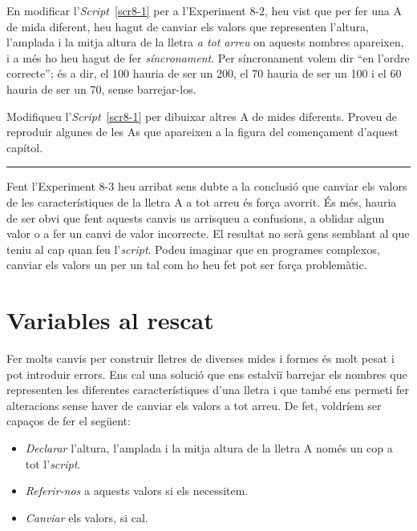 En modificar l'\emph{Script}~\ref{scr8-1} per a l'Experiment 8-2, heu vist que per fer una A de mida diferent, heu hagut de canviar els valors que representen l'altura, l'amplada i la mitja altura de la lletra \emph{a tot arreu} on aquests nombres apareixen, i a més ho heu hagut de fer \emph{síncronament}. Per síncronament volem dir ``en l'ordre correcte''; és a dir, el 100 hauria de ser un 200, el 70 hauria de ser un 100 i el 60 hauria de ser un 70, sense barrejar-los.
\begin{center}
\colorbox{black}{}
\end{center}
{\small
\noindent
Modifiqueu l'\emph{Script}~\ref{scr8-1} per dibuixar altres A de mides diferents. Proveu de reproduir algunes de les As que apareixen a la figura del començament d'aquest capítol.}\\
\noindent
\rule{\textwidth}{3pt}
\vspace{1mm}

Fent l'Experiment 8-3 heu arribat sens dubte a la conclusió que canviar els valors de les característiques de la lletra A a tot arreu és força avorrit. És més, hauria de ser obvi que fent aquests canvis us arrisqueu a confusions, a oblidar algun valor o a fer un canvi de valor incorrecte. El resultat no serà gens semblant al que teniu al cap quan feu l'\emph{script}. Podeu imaginar que en programes complexos, canviar els valors un per un tal com ho heu fet pot ser força problemàtic.

\section{Variables al rescat}
Fer molts canvis per construir lletres de diverses mides i formes és molt pesat i pot introduir errors. Ens cal una solució que ens estalviï barrejar els nombres que representen les diferentes característiques d'una lletra i que també ens permeti fer alteracions sense haver de canviar els valors a tot arreu. De fet, voldríem ser capaços de fer el següent:
\begin{itemize}
\item \emph{Declarar} l'altura, l'amplada i la mitja altura de la lletra A només un cop a tot l'\emph{script}.
\item \emph{Referir-nos} a aquests valors si els necessitem.
\item \emph{Canviar} els valors, si cal.
\end{itemize}

